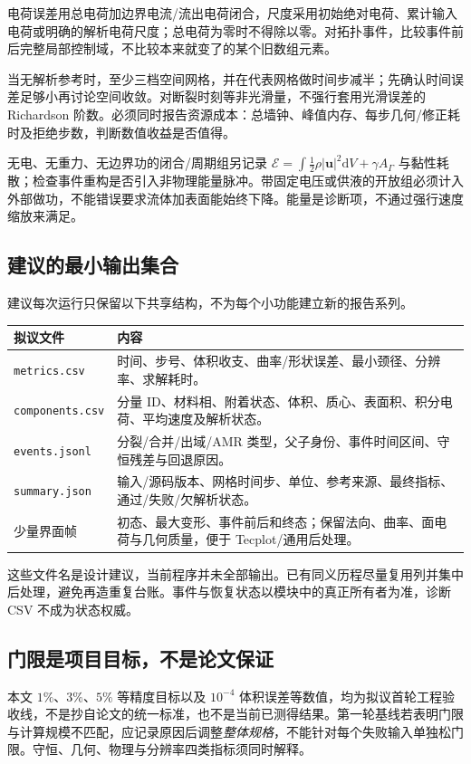 \documentclass[11pt,a4paper]{article}
\newcommand{\dd}{\mathrm{d}}
\newcommand{\vct}[1]{\boldsymbol{#1}}
\newcommand{\code}[1]{{\small\nolinkurl{#1}}}
\begin{document}
电荷误差用总电荷加边界电流/流出电荷闭合，尺度采用初始绝对电荷、累计输入电荷或明确的解析电荷尺度；总电荷为零时不得除以零。对拓扑事件，比较事件前后完整局部控制域，不比较本来就变了的某个旧数组元素。

当无解析参考时，至少三档空间网格，并在代表网格做时间步减半；先确认时间误差足够小再讨论空间收敛。对断裂时刻等非光滑量，不强行套用光滑误差的 Richardson 阶数。必须同时报告资源成本：总墙钟、峰值内存、每步几何/修正耗时及拒绝步数，判断数值收益是否值得。

无电、无重力、无边界功的闭合/周期组另记录 $\mathcal E=\int\tfrac12\rho|\vct u|^2\dd V+\gamma A_\Gamma$ 与黏性耗散；检查事件重构是否引入非物理能量脉冲。带固定电压或供液的开放组必须计入外部做功，不能错误要求流体加表面能始终下降。能量是诊断项，不通过强行速度缩放来满足。

\subsection{建议的最小输出集合}
建议每次运行只保留以下共享结构，不为每个小功能建立新的报告系列。

\noindent
\begin{tabularx}{\linewidth}{L{40mm}Y}
\toprule 拟议文件 & 内容\\\midrule
\code{metrics.csv} & 时间、步号、体积收支、曲率/形状误差、最小颈径、分辨率、求解耗时。\\
\code{components.csv} & 分量 ID、材料相、附着状态、体积、质心、表面积、积分电荷、平均速度及解析状态。\\
\code{events.jsonl} & 分裂/合并/出域/AMR 类型，父子身份、事件时间区间、守恒残差与回退原因。\\
\code{summary.json} & 输入/源码版本、网格时间步、单位、参考来源、最终指标、通过/失败/欠解析状态。\\
少量界面帧 & 初态、最大变形、事件前后和终态；保留法向、曲率、面电荷与几何质量，便于 Tecplot/通用后处理。\\\bottomrule
\end{tabularx}

这些文件名是设计建议，当前程序并未全部输出。已有同义历程尽量复用列并集中后处理，避免再造重复台账。事件与恢复状态以模块中的真正所有者为准，诊断 CSV 不成为状态权威。

\subsection{门限是项目目标，不是论文保证}
本文 $1\%$、$3\%$、$5\%$ 等精度目标以及 $10^{-4}$ 体积误差等数值，均为拟议首轮工程验收线，不是抄自论文的统一标准，也不是当前已测得结果。第一轮基线若表明门限与计算规模不匹配，应记录原因后调整\emph{整体规格}，不能针对每个失败输入单独松门限。守恒、几何、物理与分辨率四类指标须同时解释。
\end{document}

